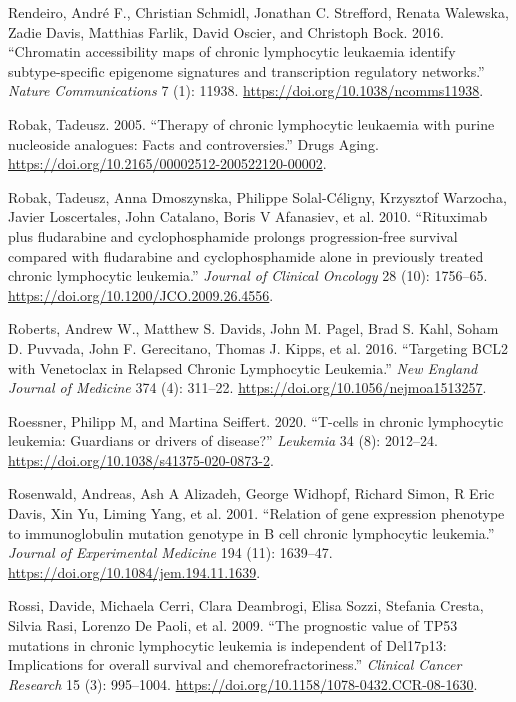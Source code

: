 \documentclass[11pt, a4paper, twosided]{book}
\newenvironment{CSLReferences}%
  {}%
  {\par}
\begin{document}
\begin{CSLReferences}{1}{0}
\leavevmode{}%
Rendeiro, André F., Christian Schmidl, Jonathan C. Strefford, Renata Walewska, Zadie Davis, Matthias Farlik, David Oscier, and Christoph Bock. 2016. {``{Chromatin accessibility maps of chronic lymphocytic leukaemia identify subtype-specific epigenome signatures and transcription regulatory networks}.''} \emph{Nature Communications} 7 (1): 11938. \url{https://doi.org/10.1038/ncomms11938}.

\leavevmode{}%
Robak, Tadeusz. 2005. {``{Therapy of chronic lymphocytic leukaemia with purine nucleoside analogues: Facts and controversies}.''} Drugs Aging. \url{https://doi.org/10.2165/00002512-200522120-00002}.

\leavevmode{}%
Robak, Tadeusz, Anna Dmoszynska, Philippe Solal-Céligny, Krzysztof Warzocha, Javier Loscertales, John Catalano, Boris V Afanasiev, et al. 2010. {``{Rituximab plus fludarabine and cyclophosphamide prolongs progression-free survival compared with fludarabine and cyclophosphamide alone in previously treated chronic lymphocytic leukemia}.''} \emph{Journal of Clinical Oncology} 28 (10): 1756--65. \url{https://doi.org/10.1200/JCO.2009.26.4556}.

\leavevmode{}%
Roberts, Andrew W., Matthew S. Davids, John M. Pagel, Brad S. Kahl, Soham D. Puvvada, John F. Gerecitano, Thomas J. Kipps, et al. 2016. {``{Targeting BCL2 with Venetoclax in Relapsed Chronic Lymphocytic Leukemia}.''} \emph{New England Journal of Medicine} 374 (4): 311--22. \url{https://doi.org/10.1056/nejmoa1513257}.

\leavevmode{}%
Roessner, Philipp M, and Martina Seiffert. 2020. {``{T-cells in chronic lymphocytic leukemia: Guardians or drivers of disease?}''} \emph{Leukemia} 34 (8): 2012--24. \url{https://doi.org/10.1038/s41375-020-0873-2}.

\leavevmode{}%
Rosenwald, Andreas, Ash A Alizadeh, George Widhopf, Richard Simon, R Eric Davis, Xin Yu, Liming Yang, et al. 2001. {``{Relation of gene expression phenotype to immunoglobulin mutation genotype in B cell chronic lymphocytic leukemia}.''} \emph{Journal of Experimental Medicine} 194 (11): 1639--47. \url{https://doi.org/10.1084/jem.194.11.1639}.

\leavevmode{}%
Rossi, Davide, Michaela Cerri, Clara Deambrogi, Elisa Sozzi, Stefania Cresta, Silvia Rasi, Lorenzo De Paoli, et al. 2009. {``{The prognostic value of TP53 mutations in chronic lymphocytic leukemia is independent of Del17p13: Implications for overall survival and chemorefractoriness}.''} \emph{Clinical Cancer Research} 15 (3): 995--1004. \url{https://doi.org/10.1158/1078-0432.CCR-08-1630}.


\end{CSLReferences}
\end{document}

